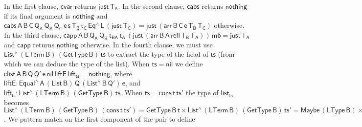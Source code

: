 \documentclass[9pt]{entcs}
\begin{document}
In the first clause, $\mathsf{cvar}$ returns $\mathsf{just\,T_A}$.  In
the second clause, $\mathsf{cabs}$ returns $\mathsf{nothing}$ if its
final argument is $\mathsf{nothing}$ and $\mathsf{cabs\, A \,B \,C
  \,Q_A\, Q_B \,Q_C\, e \,s \,T_B\, t_C\, Eq^\wedge\,
L\, (just \,T_C) = just \, (arr\, B\, C\, e\, T_B \,T_C)}$ otherwise.
In the third clause, $\mathsf{capp\, A \,B \, Q_A \, Q_B \, t_{BA}\,
  t_A \, (just \, (arr\, B \,A\, refl\, T_B\, T_A))\, mb = just\,
  T_A}$ and $\mathsf{capp}$ returns $\mathsf{nothing}$ otherwise.  In
the fourth clause, we must use $\mathsf{List^{\wedge}\, (LTerm\, B)\,
  (GetType\, B)\, ts}$ to extract the type of the head of
$\mathsf{ts}$ (from which we can deduce the type of the list). When
$\mathsf{ts} = \mathsf{nil}$ we define $\mathsf{clist\, A\, B\, Q\,
  Q'\, e\, nil \, liftE\, lift_{ts} = nothing}$, where $\mathsf{liftE
  : Equal^{\wedge}\, A\, (List\,B) \, Q\, (List^{\wedge}\, B\, Q')\,
  e}$, and $\mathsf{lift_{ts} : List^{\wedge}\, (LTerm\, B)\,
  (GetType\, B)\, ts}$.  When $\mathsf{ts} = \mathsf{cons\,t\,ts'}$
the type of $\mathsf{list_{ts}}$ becomes $\mathsf{List^{\wedge}\,
  (LTerm\, B)\, (GetType\, B)\, (cons\, t\, ts')} = \mathsf{GetType\,
  B\, t \times List^{\wedge}\, (LTerm\, B)\, (GetType\, B)\, ts'} =
\mathsf{Maybe\, (LType\, B) \times List^{\wedge}\, (LTerm\, B)\,
  (GetType\, B)\, ts'}$. We pattern match on the first component
of the pair to define
\end{document}

